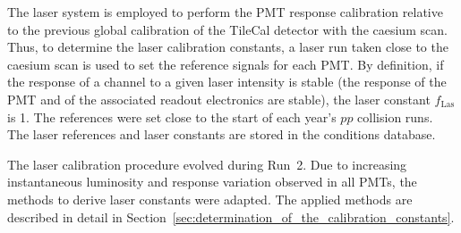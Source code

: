 The laser system is employed to perform the PMT response calibration relative to the previous global calibration of the TileCal detector with the caesium scan. Thus, to determine the laser calibration constants, a laser run taken close to the caesium scan is used to set the reference signals for each PMT. 
By definition, if the response of a channel to a given laser intensity is stable (the response of the PMT and of the associated readout electronics are stable), the laser constant $f_{\mathrm{Las}}$ is 1. The references were set close to the start of each year's $pp$ collision runs. 
The laser references and laser constants are stored in the conditions database. 

The laser calibration procedure evolved during Run~2. Due to increasing instantaneous luminosity and response variation observed in all PMTs, the methods to derive laser constants were adapted. The applied methods are described in detail in Section~\ref{sec:determination_of_the_calibration_constants}. 


